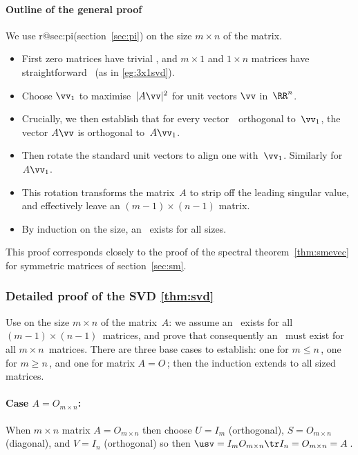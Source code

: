 




\paragraph{Outline of the general proof} 
We use  
\ifcsname r@sec:pi\endcsname (section~\ref{sec:pi}) \fi
on the size \(m\times n\) of the matrix.
\begin{itemize}
\item First zero matrices have trivial \svd, and
\(m\times 1\) and \(1\times n\) matrices have straightforward \svd\ (as in \autoref{eg:3x1svd}).
\item Choose \(\vv_1\) to maximise~\(|A\vv|^2\) for unit vectors \(\vv\) in~\(\RR^n\).
\item Crucially, we then establish that for every vector~\vv\ orthogonal to~\(\vv_1\), the vector \(A\vv\) is orthogonal to~\(A\vv_1\).
\item Then rotate the standard unit vectors to align one with~\(\vv_1\). Similarly for~\(A\vv_1\).  
\item This rotation transforms the matrix~\(A\) to strip off the leading singular value, and effectively leave an \((m-1)\times(n-1)\) matrix.
\item  By induction on the size, an \svd\ exists for all sizes.
\end{itemize}
This proof corresponds closely to the proof of the spectral theorem~\ref{thm:smevec} for symmetric matrices of section~\ref{sec:sm}. 





\subsubsection{Detailed proof of the SVD \autoref{thm:svd}}
\label{sec:dpsvdt}

Use  on the size \(m\times n\) of the matrix~\(A\): we assume an \svd\ exists for all \((m-1)\times(n-1)\)~matrices, and prove that consequently an \svd\ must exist for all \(m\times n\)~matrices.  There are three base cases to establish: one for \(m\leq n\)\,, one for \(m\geq n\)\,, and one for matrix \(A=O\)\,; then the induction extends to all sized matrices.

\paragraph{Case $A=O_{m\times n}$:}
When \(m\times n\) matrix \(A=O_{m\times n}\) then choose \(U=I_m\) (orthogonal), \(S=O_{m\times n}\) (diagonal), and \(V=I_n\) (orthogonal) so then \(\usv=I_mO_{m\times n}\tr I_n=O_{m\times n}=A\)\,.  


